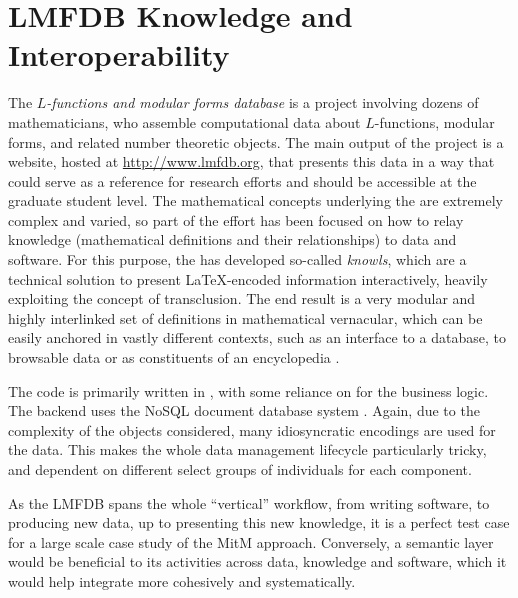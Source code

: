 \section{LMFDB Knowledge and Interoperability}\label{sec:lmfdb}
The \emph{$L$-functions and modular forms database} is a project involving dozens of
mathematicians, who assemble computational data about $L$-functions, modular forms, and
related number theoretic objects. The main output of the project is a website, hosted at
\url{http://www.lmfdb.org}, that presents this data in a way that could serve as a
reference for research efforts and should be accessible at the graduate student level.
The mathematical concepts underlying the \LMFDB are extremely complex and varied, so part
of the effort has been focused on how to relay knowledge (mathematical definitions and their
relationships) to data and software. For this purpose, the \LMFDB has developed so-called
\emph{knowls}, which are a technical solution to present \LaTeX-encoded information
interactively, heavily exploiting the concept of transclusion. The end result is a
very modular and highly interlinked set of definitions in mathematical vernacular, which can be easily anchored in vastly different contexts, such as an interface to a database, to browsable data or as constituents of an encyclopedia \cite{lmfdb-definitions}.

The \LMFDB code is primarily written in \Python, with some reliance on \Sage for
the business logic. The backend
uses the NoSQL document database system \Mongo \cite{lmfdb-repo}. Again, due to the
complexity of the objects considered, many idiosyncratic encodings are used for the
data. This makes the whole data management lifecycle particularly tricky, and dependent on
different select groups of individuals for each component.

As the LMFDB spans the whole ``vertical'' workflow, from writing software, to producing new
data, up to presenting this new knowledge, it is a perfect test case for a large scale
case study of the MitM approach. Conversely, a semantic layer would be beneficial to its
activities across data, knowledge and software, which it would help integrate more
cohesively and systematically.

